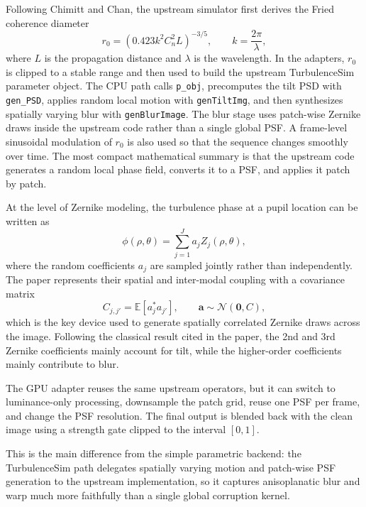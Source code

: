 \documentclass{article}
\begin{document}
Following Chimitt and Chan, the upstream simulator first derives the Fried coherence diameter
\begin{equation}
r_0 = \left(0.423 k^2 C_n^2 L\right)^{-3/5}, \qquad k = \frac{2\pi}{\lambda},
\end{equation}
where $L$ is the propagation distance and $\lambda$ is the wavelength. In the adapters, $r_0$ is clipped to a stable range and then used to build the upstream TurbulenceSim parameter object. The CPU path calls \texttt{p\_obj}, precomputes the tilt PSD with \texttt{gen\_PSD}, applies random local motion with \texttt{genTiltImg}, and then synthesizes spatially varying blur with \texttt{genBlurImage}. The blur stage uses patch-wise Zernike draws inside the upstream code rather than a single global PSF. A frame-level sinusoidal modulation of $r_0$ is also used so that the sequence changes smoothly over time. The most compact mathematical summary is that the upstream code generates a random local phase field, converts it to a PSF, and applies it patch by patch.

At the level of Zernike modeling, the turbulence phase at a pupil location can be written as
\begin{equation}
\phi(\rho,\theta) = \sum_{j=1}^{J} a_j Z_j(\rho,\theta),
\end{equation}
where the random coefficients $a_j$ are sampled jointly rather than independently. The paper represents their spatial and inter-modal coupling with a covariance matrix
\begin{equation}
C_{j,j'} = \mathbb{E}[a_j^* a_{j'}], \qquad \mathbf{a} \sim \mathcal{N}(\mathbf{0}, C),
\end{equation}
which is the key device used to generate spatially correlated Zernike draws across the image. Following the classical result cited in the paper, the 2nd and 3rd Zernike coefficients mainly account for tilt, while the higher-order coefficients mainly contribute to blur.

The GPU adapter reuses the same upstream operators, but it can switch to luminance-only processing, downsample the patch grid, reuse one PSF per frame, and change the PSF resolution. The final output is blended back with the clean image using a strength gate clipped to the interval $[0,1]$.

This is the main difference from the simple parametric backend: the TurbulenceSim path delegates spatially varying motion and patch-wise PSF generation to the upstream implementation, so it captures anisoplanatic blur and warp much more faithfully than a single global corruption kernel.
\end{document}
